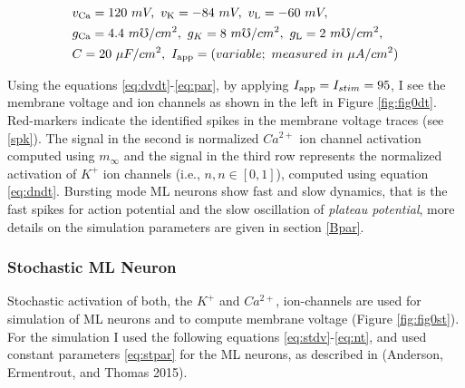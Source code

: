 \documentclass[
]{article}
\begin{document}
\begin{equation} \label{eq:par}
\begin{split}
&v_{\rm Ca} = 120\ mV,\  v_{\rm K} = -84\ mV,\ v_{\rm L} = -60\ mV,
\\ &g_{\rm Ca} = 4.4\ m\mho/cm^2, \ g_{K\rm } = 8\ m\mho/cm^2,\ 
    g_{\rm L} = 2\ m\mho/cm^2,
\\ &C = 20\ \mu F/cm^2,\ I_{\rm app} = (variable;\ measured\ in\ 
    \mu A/cm^2) 
\end{split}
\end{equation}

Using the equations \eqref{eq:dvdt}-\eqref{eq:par}, by applying \(I_{\rm app}=I_{stim} = 95\), I see the membrane voltage and ion channels as shown in the left in Figure \ref{fig:fig0dt}. Red-markers indicate the identified spikes in the membrane voltage traces (see \ref{spk}). The signal in the second is normalized \(Ca^{2+}\) ion channel activation computed using \(m_{\infty}\) and the signal in the third row represents the normalized activation of \(K^+\) ion channels (i.e., \(n, n\in[0,1]\)), computed using equation \eqref{eq:dndt}. Bursting mode ML neurons show fast and slow dynamics, that is the fast spikes for action potential and the slow oscillation of \emph{plateau potential}, more details on the simulation parameters are given in section \ref{Bpar}.

\hypertarget{MLst}{%
\subsubsection{Stochastic ML Neuron}\label{MLst}}

Stochastic activation of both, the \(K^+\) and \(Ca^{2+}\), ion-channels are used for simulation of ML neurons and to compute membrane voltage (Figure \ref{fig:fig0st}). For the simulation I used the following equations \eqref{eq:stdv}-\eqref{eq:nt}, and used constant parameters \eqref{eq:stpar} for the ML neurons, as described in (Anderson, Ermentrout, and Thomas 2015).
\end{document}
